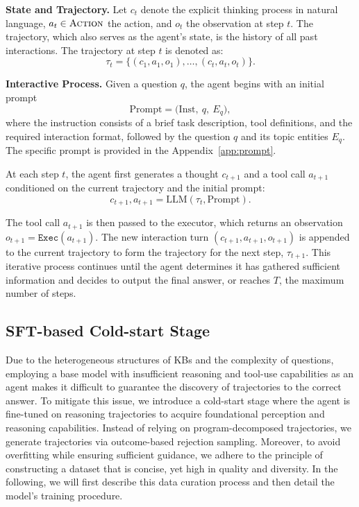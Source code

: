 \textbf{State and Trajectory.}
Let $c_t$ denote the explicit thinking process in natural language, $a_t\in \textsc{Action}$ the action, and $o_t$ the observation at step $t$. The trajectory, which also serves as the agent's state, is the history of all past interactions. The trajectory at step $t$ is denoted as:
\begin{equation}
\tau_t = \{(c_1,a_1,o_1),\ldots,(c_{t},a_{t},o_{t})\}.
\end{equation}

\textbf{Interactive Process.}
Given a question $q$, the agent begins with an initial prompt 
\begin{equation}
\mathrm{Prompt}=\big(\mathrm{Inst},\ q,\ E_q\big),
\end{equation}
where the instruction consists of a brief task description, tool definitions, and the required interaction format, followed by the question $q$ and its topic entities $E_q$. The specific prompt is provided in the Appendix~\ref{app:prompt}.

At each step $t$, the agent first generates a thought $c_{t+1}$ and a tool call $a_{t+1}$ conditioned on the current trajectory and the initial prompt:
\begin{equation}
c_{t+1}, a_{t+1} = \mathrm{LLM}(\tau_t, \mathrm{Prompt}).
\end{equation}

The tool call $a_{t+1}$ is then passed to the executor, which returns an observation $o_{t+1} = \texttt{Exec}(a_{t+1})$. The new interaction turn $(c_{t+1}, a_{t+1}, o_{t+1})$ is appended to the current trajectory to form the trajectory for the next step, $\tau_{t+1}$. This iterative process continues until the agent determines it has gathered sufficient information and decides to output the final answer, or reaches $T$, the maximum number of steps.

\subsection{SFT-based Cold-start Stage}
Due to the heterogeneous structures of KBs and the complexity of questions, employing a base model with insufficient reasoning and tool-use capabilities as an agent makes it difficult to guarantee the discovery of trajectories to the correct answer. To mitigate this issue, we introduce a cold-start stage where the agent is fine-tuned on reasoning trajectories to acquire foundational perception and reasoning capabilities. Instead of relying on program-decomposed trajectories, we generate trajectories via outcome-based rejection sampling. Moreover, to avoid overfitting while ensuring sufficient guidance, we adhere to the principle of constructing a dataset that is concise, yet high in quality and diversity. In the following, we will first describe this data curation process and then detail the model's training procedure. 

